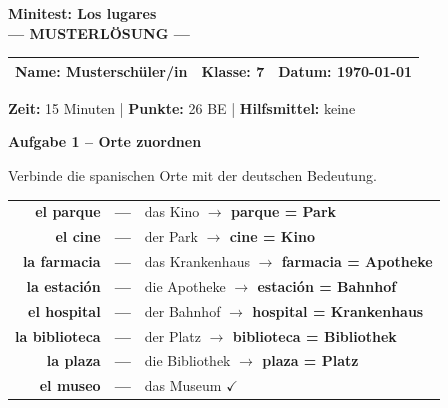 \documentclass[11pt, a4paper]{article}
\newcommand{\fachfarbe}{spanisch}
\newcommand{\thema}{Minitest: Los lugares}
\newcommand{\klasse}{7}
\newcommand{\maxpunkte}{26}
\newcommand{\zeit}{15 Minuten}
\newcommand{\datum}{\today}
\newcommand{\punktebox}[1]{\hfill\fbox{\small \_\_\_/#1}}
\newcommand{\lsg}[1]{\textcolor{loesung}{\textbf{#1}}}
\newenvironment{aufgabe}[1]{%
    \needspace{5\baselineskip}%
    \nopagebreak[4]%
    \vspace{10pt}
    \noindent\textbf{\textcolor{\fachfarbe}{Aufgabe #1}}
    \nopagebreak[4]%
    \vspace{5pt}
    \nopagebreak[4]%
    \begin{list}{}{\leftmargin=0pt}
    \item[]
}{%
    \end{list}
}
\newcommand{\es}[1]{\textcolor{\fachfarbe}{\textbf{#1}}}
\begin{document}

\begin{center}
    {\Large\bfseries\textcolor{\fachfarbe}{\thema}}\\[0.3em]
    {\large\textcolor{loesung}{\textbf{--- MUSTERLÖSUNG ---}}}
\end{center}

\vspace{5pt}

\noindent
\begin{tabularx}{\textwidth}{|X|X|X|}
\hline
\textbf{Name:} \lsg{Musterschüler/in} &
\textbf{Klasse:} \klasse &
\textbf{Datum:} \datum \\
\hline
\end{tabularx}

\vspace{10pt}

\begin{infobox}
\textbf{Zeit:} \zeit{} | \textbf{Punkte:} \maxpunkte{} BE | \textbf{Hilfsmittel:} keine
\end{infobox}

\vspace{15pt}


\begin{aufgabe}{1 -- Orte zuordnen}
Verbinde die spanischen Orte mit der deutschen Bedeutung. \punktebox{8}
\end{aufgabe}

\begin{center}
\begin{tabular}{rcl}
\es{el parque} & \lsg{---} & das Kino \lsg{$\rightarrow$ parque = Park} \\[0.8em]
\es{el cine} & \lsg{---} & der Park \lsg{$\rightarrow$ cine = Kino} \\[0.8em]
\es{la farmacia} & \lsg{---} & das Krankenhaus \lsg{$\rightarrow$ farmacia = Apotheke} \\[0.8em]
\es{la estación} & \lsg{---} & die Apotheke \lsg{$\rightarrow$ estación = Bahnhof} \\[0.8em]
\es{el hospital} & \lsg{---} & der Bahnhof \lsg{$\rightarrow$ hospital = Krankenhaus} \\[0.8em]
\es{la biblioteca} & \lsg{---} & der Platz \lsg{$\rightarrow$ biblioteca = Bibliothek} \\[0.8em]
\es{la plaza} & \lsg{---} & die Bibliothek \lsg{$\rightarrow$ plaza = Platz} \\[0.8em]
\es{el museo} & \lsg{---} & das Museum \lsg{$\checkmark$} \\
\end{tabular}
\end{center}
\end{document}
